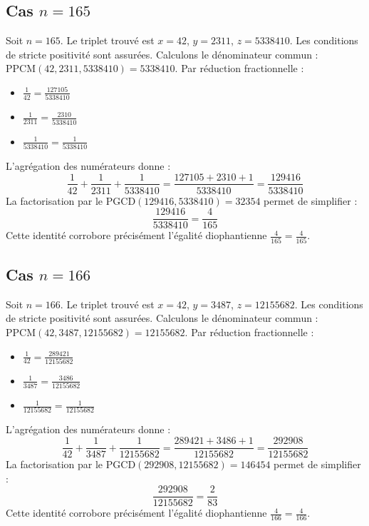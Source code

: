 \documentclass[11pt,a4paper]{article}
\begin{document}
\subsection{Cas $n = 165$}
Soit $n = 165$. Le triplet trouvé est $x = 42$, $y = 2311$, $z = 5338410$.
Les conditions de stricte positivité sont assurées.
Calculons le dénominateur commun : $\text{PPCM}(42, 2311, 5338410) = 5338410$.
Par réduction fractionnelle :
\begin{itemize}
    \item $\frac{1}{42} = \frac{127105}{5338410}$
    \item $\frac{1}{2311} = \frac{2310}{5338410}$
    \item $\frac{1}{5338410} = \frac{1}{5338410}$
\end{itemize}
L'agrégation des numérateurs donne :
$$ \frac{1}{42} + \frac{1}{2311} + \frac{1}{5338410} = \frac{127105 + 2310 + 1}{5338410} = \frac{129416}{5338410} $$
La factorisation par le $\text{PGCD}(129416, 5338410) = 32354$ permet de simplifier :
$$ \frac{129416}{5338410} = \frac{4}{165} $$
Cette identité corrobore précisément l'égalité diophantienne $\frac{4}{165} = \frac{4}{165}$.

\subsection{Cas $n = 166$}
Soit $n = 166$. Le triplet trouvé est $x = 42$, $y = 3487$, $z = 12155682$.
Les conditions de stricte positivité sont assurées.
Calculons le dénominateur commun : $\text{PPCM}(42, 3487, 12155682) = 12155682$.
Par réduction fractionnelle :
\begin{itemize}
    \item $\frac{1}{42} = \frac{289421}{12155682}$
    \item $\frac{1}{3487} = \frac{3486}{12155682}$
    \item $\frac{1}{12155682} = \frac{1}{12155682}$
\end{itemize}
L'agrégation des numérateurs donne :
$$ \frac{1}{42} + \frac{1}{3487} + \frac{1}{12155682} = \frac{289421 + 3486 + 1}{12155682} = \frac{292908}{12155682} $$
La factorisation par le $\text{PGCD}(292908, 12155682) = 146454$ permet de simplifier :
$$ \frac{292908}{12155682} = \frac{2}{83} $$
Cette identité corrobore précisément l'égalité diophantienne $\frac{4}{166} = \frac{4}{166}$.
\end{document}
